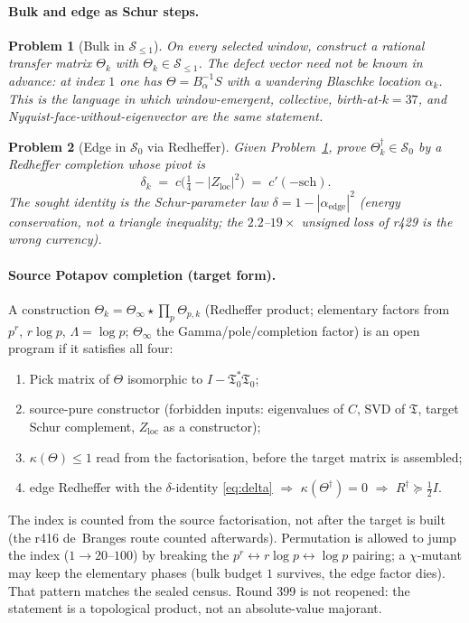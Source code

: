 \documentclass[11pt]{article}
\newtheorem{problem}{Problem}
\theoremstyle{remark}
\newcommand{\Rd}{R^{\dagger}}
\newcommand{\half}{\tfrac12}
\newcommand{\Tfrak}{\mathfrak{T}}
\newcommand{\Zloc}{Z_{\mathrm{loc}}}
\newcommand{\Sk}{\mathcal{S}}
\begin{document}
\paragraph{Bulk and edge as Schur steps.}

\begin{problem}[Bulk in $\Sk_{\le1}$]
\label{prob:sleq1}
On every selected window, construct a rational transfer
matrix $\Theta_{k}$ with $\Theta_{k}\in\Sk_{\le1}$.  The
defect vector need not be known in advance: at index $1$ one
has $\Theta=B_{\alpha}^{-1}S$ with a wandering Blaschke
location $\alpha_{k}$.  This is the language in which
window-emergent, collective, birth-at-$k=37$, and
Nyquist-face-without-eigenvector are the same statement.
\end{problem}

\begin{problem}[Edge in $\Sk_{0}$ via Redheffer]
\label{prob:s0}
Given Problem~\ref{prob:sleq1}, prove
$\Theta_{k}^{\dagger}\in\Sk_{0}$ by a Redheffer completion
whose pivot is
\begin{equation}\label{eq:delta}
\delta_{k}
 \;=\;
 c\bigl(\tfrac14-|\Zloc|^{2}\bigr)
 \;=\;
 c'(-\mathrm{sch}).
\end{equation}
The sought identity is the Schur-parameter law
$\delta=1-|\alpha_{\mathrm{edge}}|^{2}$
(energy conservation, not a triangle inequality; the
$2.2$--$19\times$ unsigned loss of r429 is the wrong
currency).
\end{problem}

\paragraph{Source Potapov completion (target form).}
A construction
$\Theta_{k}=\Theta_{\infty}\star\prod_{p}\Theta_{p,k}$
(Redheffer product; elementary factors from $p^{r}$,
$r\log p$, $\Lambda=\log p$; $\Theta_{\infty}$ the
Gamma/pole/completion factor) is an open program if it
satisfies all four:
\begin{enumerate}
\item[(A)] Pick matrix of $\Theta$ isomorphic to
  $I-\Tfrak_{0}^{*}\Tfrak_{0}$;
\item[(B)] source-pure constructor (forbidden inputs:
  eigenvalues of $C$, SVD of $\Tfrak$, target Schur
  complement, $\Zloc$ as a constructor);
\item[(C)] $\kappa(\Theta)\le1$ read from the factorisation,
  before the target matrix is assembled;
\item[(D)] edge Redheffer with the $\delta$-identity
  \eqref{eq:delta} $\Rightarrow$ $\kappa(\Theta^{\dagger})=0$
  $\Rightarrow$ $\Rd\succeq\half I$.
\end{enumerate}
The index is counted from the source factorisation, not
after the target is built (the r416 de~Branges route counted
afterwards).  Permutation is allowed to jump the index
($1\to20$--$100$) by breaking the
$p^{r}\leftrightarrow r\log p\leftrightarrow\log p$ pairing;
a $\chi$-mutant may keep the elementary phases (bulk budget
$1$ survives, the edge factor dies).  That pattern matches
the sealed census.  Round 399 is not reopened: the statement
is a topological product, not an absolute-value majorant.
\end{document}

